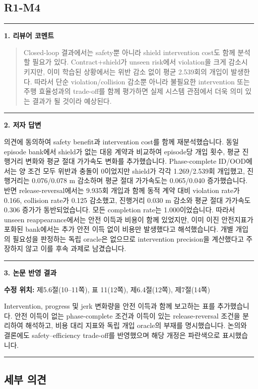 \documentclass[11pt]{article}
\newcommand{\fieldheading}[2]{%
  \par\medskip\noindent
  {\color{#1}\rule{3pt}{1.25em}}\hspace{0.55em}\textbf{#2}\par\smallskip}
\newenvironment{reviewitem}[1]
  {\subsection*{#1}}
  {\par\medskip\hrule\bigskip}
\newenvironment{reviewercomment}
  {\fieldheading{reviewercolor}{1. 리뷰어 코멘트}%
   \begin{quote}}
  {\end{quote}}
\newenvironment{authorresponse}
  {\fieldheading{responsecolor}{2. 저자 답변}}
  {\par}
\newenvironment{manuscriptrevision}[1]
  {\fieldheading{revisioncolor}{3. 논문 반영 결과}%
   \textbf{수정 위치:} #1\par\smallskip}
  {\par}
\begin{document}
\begin{reviewitem}{R1-M4}
  \begin{reviewercomment}
    Closed-loop 결과에서는 safety뿐 아니라 shield intervention cost도 함께 분석할
    필요가 있다. Contract+shield가 unseen risk에서 violation을 크게 감소시키지만,
    이미 학습된 상황에서는 위반 감소 없이 평균 2.539회의 개입이 발생한다. 따라서
    단순 violation/collision 감소뿐 아니라 불필요한 intervention 또는 주행
    효율성과의 trade-off를 함께 평가하면 실제 시스템 관점에서 더욱 의미 있는
    결과가 될 것이라 예상된다.
  \end{reviewercomment}

  \begin{authorresponse}
    의견에 동의하여 safety benefit과 intervention cost를 함께 재분석했습니다.
    동일 episode bank에서 shield가 없는 대응 계약과 비교하여 episode당 개입
    횟수, 평균 진행거리 변화와 평균 절대 가가속도 변화를 추가했습니다.
    Phase-complete ID/OOD에서는 양 조건 모두 위반과 충돌이 0이었지만 shield가
    각각 1.269/2.539회 개입했고, 진행거리는 0.076/0.078 m 감소하며 평균 절대
    가가속도는 0.065/0.040 증가했습니다. 반면 release-reversal에서는 9.935회
    개입과 함께 동적 계약 대비 violation rate가 0.166, collision rate가 0.125
    감소했고, 진행거리 0.030 m 감소와 평균 절대 가가속도 0.306 증가가
    동반되었습니다. 모든 completion rate는 1.000이었습니다. 따라서 unseen
    reappearance에서는 안전 이득과 비용이 함께 있었지만, 이미 이진 안전지표가
    포화된 bank에서는 추가 안전 이득 없이 비용만 발생했다고 해석했습니다.
    개별 개입의 필요성을 판정하는 독립 oracle은 없으므로 intervention precision을
    계산했다고 주장하지 않고 이를 후속 과제로 남겼습니다.
  \end{authorresponse}

  \begin{manuscriptrevision}{제5.6절(10--11쪽), 표 11(12쪽), 제6.4절(12쪽), 제7절(14쪽)}
    Intervention, progress 및 jerk 변화량을 안전 이득과 함께 보고하는 표를
    추가했습니다. 안전 이득이 없는 phase-complete 조건과 이득이 있는
    release-reversal 조건을 분리하여 해석하고, 비용 대리 지표와 독립 개입
    oracle의 부재를 명시했습니다. 논의와 결론에도 safety--efficiency trade-off를
    반영했으며 해당 개정은 파란색으로 표시했습니다.
  \end{manuscriptrevision}
\end{reviewitem}

\subsection*{세부 의견}
\end{document}
